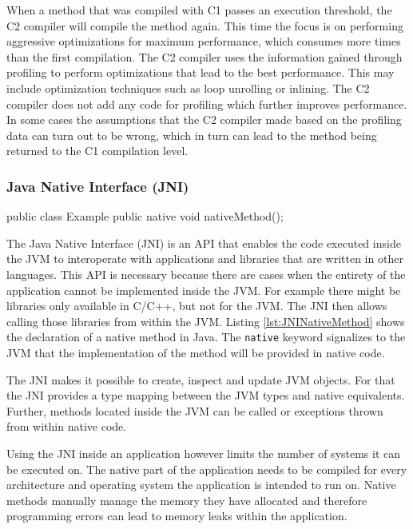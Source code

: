 When a method that was compiled with C1 passes an execution threshold, the C2 compiler will compile the method again. This time the focus is on performing aggressive optimizations for maximum performance, which consumes more times than the first compilation. The C2 compiler uses the information gained through profiling to perform optimizations that lead to the best performance. This may include optimization techniques such as loop unrolling or inlining. The C2 compiler does not add any code for profiling which further improves performance. In some cases the assumptions that the C2 compiler made based on the profiling data can turn out to be wrong, which in turn can lead to the method being returned to the C1 compilation level.

\subsubsection{Java Native Interface (JNI)}


\begin{JavaCode}[float,numbers=none,caption=Declaration of a native method in Java., label=lst:JNINativeMethod]
    public class Example {
        public native void nativeMethod();
    }
\end{JavaCode}


The Java Native Interface (JNI) is an API that enables the code executed inside the JVM to interoperate with applications and libraries that are written in other languages. This API is necessary because there are cases when the entirety of the application cannot be implemented inside the JVM. For example there might be libraries only available in C/C++, but not for the JVM. The JNI then allows calling those libraries from within the JVM. Listing \ref{lst:JNINativeMethod} shows the declaration of a native method in Java. The \texttt{native} keyword signalizes to the JVM that the implementation of the method will be provided in native code.


The JNI makes it possible to create, inspect and update JVM objects. For that the JNI provides a type mapping between the JVM types and native equivalents. Further, methods located inside the JVM can be called or exceptions thrown from within native code.

Using the JNI inside an application however limits the number of systems it can be executed on. The native part of the application needs to be compiled for every architecture and operating system the application is intended to run on. Native methods manually manage the memory they have allocated and therefore programming errors can lead to memory leaks within the application.  

